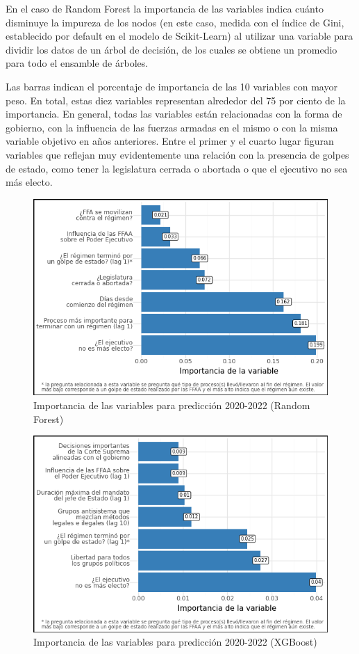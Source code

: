 \documentclass{article}
\begin{document}
En el caso de Random Forest la importancia de las variables indica cuánto disminuye la impureza
de los nodos (en este caso, medida con el índice de Gini, establecido por default en el modelo de 
Scikit-Learn) al utilizar una variable para dividir los datos de un árbol de decisión, de los cuales
se obtiene un promedio para todo el ensamble de árboles.

Las barras indican el porcentaje de importancia de las 10 variables con mayor peso. En total, estas 
diez variables representan alrededor del 75 por ciento de la importancia. En general, todas las 
variables están relacionadas con la forma de gobierno, con la influencia de las fuerzas armadas en el 
mismo o con la misma variable objetivo en años anteriores. Entre el primer y el cuarto lugar figuran 
variables que reflejan muy evidentemente una relación con la presencia de golpes de estado, como 
tener la legislatura cerrada o abortada o que el ejecutivo no sea más electo.

\begin{figure}[H]
 \centering 
 \includegraphics[width=1\textwidth]{7_feature_importance_rf.png}
 \caption{Importancia de las variables para predicción 2020-2022 (Random Forest) \label{fig:feat_imp_rf}}
\end{figure}

\begin{figure}[H]
 \centering 
 \includegraphics[width=1\textwidth]{8_feature_importance_xgb.png}
 \caption{Importancia de las variables para predicción 2020-2022 (XGBoost) \label{fig:feat_imp_xgb}}
\end{figure}
\end{document}
